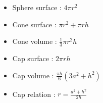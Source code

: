 \begin{itemize}
  \item Sphere surface : $4\pi r^2$
  \item Cone surface : $\pi r^2 + \pi r h$
  \item Cone volume : $\frac{1}{3} \pi r^2 h$
  \item Cap surface : $2 \pi r h$
  \item Cap volume : $\frac{\pi h}{6}(3 a^2 + h^2)$
  \item Cap relation : $r = \frac{a^2 + h^2}{2h}$
\end{itemize}
